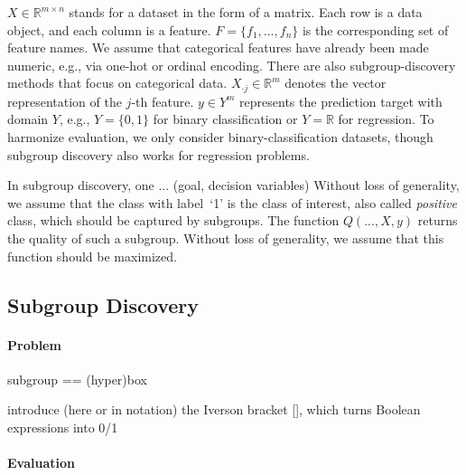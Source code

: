 \documentclass{article}
\theoremstyle{definition}
\begin{document}
$X \in \mathbb{R}^{m \times n}$ stands for a dataset in the form of a matrix.
Each row is a data object, and each column is a feature.
$F = \{f_1, \dots, f_n\}$ is the corresponding set of feature names.
We assume that categorical features have already been made numeric, e.g., via one-hot or ordinal encoding.
There are also subgroup-discovery methods that focus on categorical data.
$X_{\cdot{}j} \in \mathbb{R}^m$ denotes the vector representation of the $j$-th feature.
$y \in Y^m$ represents the prediction target with domain $Y$, e.g., $Y=\{0,1\}$ for binary classification or $Y=\mathbb{R}$ for regression.
To harmonize evaluation, we only consider binary-classification datasets, though subgroup discovery also works for regression problems.

In subgroup discovery, one ... (goal, decision variables)
Without loss of generality, we assume that the class with label~`1' is the class of interest, also called \emph{positive} class, which should be captured by subgroups.
The function $Q(...,X,y)$ returns the quality of such a subgroup.
Without loss of generality, we assume that this function should be maximized.

\subsection{Subgroup Discovery}
\label{sec:csd:fundamentals:subgroup-discovery}

\cite{helal2016subgroup} \cite{herrera2011overview} \cite{atzmueller2015subgroup} \cite{ventura2018subgroup} \cite{meeng2021real}

\paragraph{Problem}

subgroup == (hyper)box

introduce (here or in notation) the Iverson bracket [], which turns Boolean expressions into 0/1

\paragraph{Evaluation}
\end{document}
